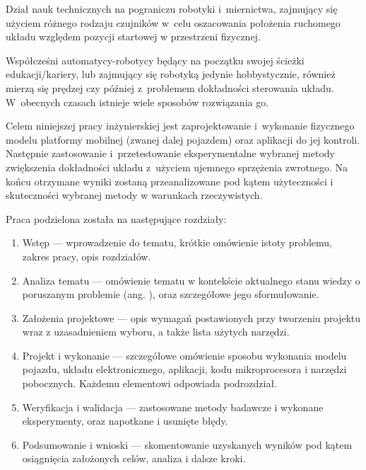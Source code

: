\begin{Definition}[Odometria]\label{def:odometria}
    Dział nauk technicznych na pograniczu robotyki i~miernictwa, zajmujący się użyciem różnego rodzaju czujników w~celu oszacowania położenia ruchomego układu względem pozycji startowej w przestrzeni fizycznej.
\end{Definition}

Współcześni automatycy-robotycy będący na początku swojej ścieżki edukacji/kariery, lub zajmujący się robotyką jedynie hobbystycznie, również mierzą się prędzej czy później z~problemem dokładności sterowania układu. W~obecnych czasach istnieje wiele sposobów rozwiązania go.

Celem niniejszej pracy inżynierskiej jest zaprojektowanie i~wykonanie fizycznego modelu platformy mobilnej (zwanej dalej pojazdem) oraz aplikacji do jej kontroli. Następnie zastosowanie i~przetestowanie eksperymentalne wybranej metody zwiększenia dokładności układu z~użyciem ujemnego sprzężenia zwrotnego. Na końcu otrzymane wyniki zostaną przeanalizowane pod kątem użyteczności i skuteczności wybranej metody w warunkach rzeczywistych.

Praca podzielona została na następujące rozdziały\cite{bib:wymaganiapracy}:
\begin{enumerate}
    \item Wstęp --- wprowadzenie do tematu, krótkie omówienie istoty problemu, zakres pracy, opis rozdziałów.
    \item Analiza tematu --- omówienie tematu w kontekście aktualnego stanu wiedzy o poruszanym problemie (ang. ), oraz szczegółowe jego sformułowanie.
    \item Założenia projektowe --- opis wymagań postawionych przy tworzeniu projektu wraz z uzasadnieniem wyboru, a także lista użytych narzędzi.
    \item Projekt i wykonanie --- szczegółowe omówienie sposobu wykonania modelu pojazdu, układu elektronicznego, aplikacji, kodu mikroprocesora i narzędzi pobocznych. Każdemu elementowi odpowiada podrozdział.
    \item Weryfikacja i walidacja --- zastosowane metody badawcze i wykonane eksperymenty, oraz napotkane i usunięte błędy.
    \item Podsumowanie i wnioski --- skomentowanie uzyskanych wyników pod kątem osiągnięcia założonych celów, analiza i dalsze kroki.
\end{enumerate}